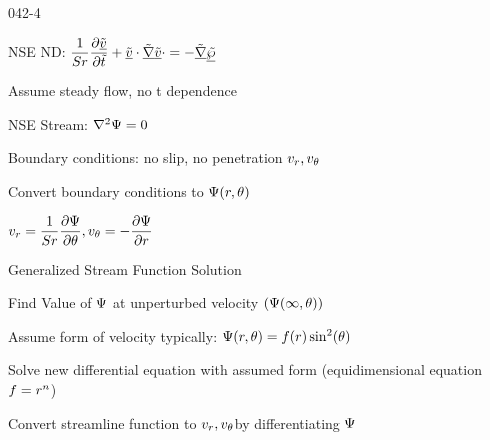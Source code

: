 \begin{mitframe}{042-4}
            
\begin{listone}
\item NSE ND: $ \dfrac{1}{\strouhal}\dfrac{\partial\uline{\tilde{\vvel}}}{\partial\tilde{t}}+\uline{\tilde{\vvel}}\cdot\tilde{\gradop}\uline{\tilde{\vvel}}\cdot=-\tilde{\gradop}\uline{\tilde{\dynpress}}$
			\begin{listtwo}
			\item Assume steady flow, no t dependence
            \end{listtwo}
\item NSE Stream: $\nabla^2\streamfunc=0$
\item Boundary conditions: no slip, no penetration $\vvel_{\pos}, \vvel_{\theta}$
\item Convert boundary conditions to $\streamfunc(\pos,\theta)$
			\begin{listtwo}
            \item $\vvel_{\pos}=\dfrac{1}{\strouhal}\dfrac{\partial\streamfunc}{\partial\theta}, \vvel_{\theta}=-\dfrac{\partial\streamfunc}{\partial\pos}$
            \end{listtwo}
\item Generalized Stream Function Solution
			\begin{listtwo}
            \item Find Value of $\streamfunc$ at unperturbed velocity $(\streamfunc(\infty,\theta))$
            \item Assume form of velocity typically: 
          $\streamfunc(\pos,\theta)=\fug(\pos)\sin^2(\theta)$
        	\item Solve new differential equation with assumed form 
            (equidimensional equation $\fug=\pos^n$)
            \end{listtwo}
Convert streamline function to $\vvel_{\pos}, \vvel_{\theta}$by differentiating $\streamfunc$

\end{listone}
\end{mitframe}